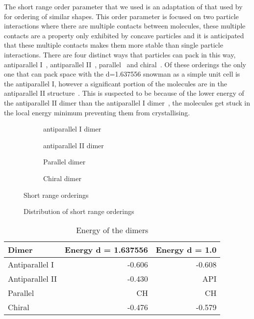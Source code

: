 The short range order parameter that we used is an adaptation of that used by~\textcite{} for ordering of similar shapes. This order parameter is focused on two particle interactions where there are multiple contacts between molecules, these multiple contacts are a property only exhibited by concave particles and it is anticipated that these multiple contacts makes them more stable than single particle interactions. There are four distinct ways that particles can pack in this way, antiparallel I~, antiparallel II~, parallel~ and chiral~. Of these orderings the only one that can pack space with the d=1.637556 snowman as a simple unit cell is the antiparallel I, however a significant portion of the molecules are in the antiparallel II structure~. This is suspected to be because of the lower energy of the antiparallel II dimer than the antiparallel I dimer~, the molecules get stuck in the local energy minimum preventing them from crystallising.

\begin{figure}
    \begin{subfigure}{0.5\textwidth}
        \caption{antiparallel I dimer}
        \label{fig:antiparallel i}
    \end{subfigure}
    \begin{subfigure}{0.5\textwidth}
        \caption{antiparallel II dimer}
        \label{fig:antiparallel ii}
    \end{subfigure}
    \begin{subfigure}{0.5\textwidth}
        \caption{Parallel dimer}
        \label{fig:parallel}
    \end{subfigure}
    \begin{subfigure}{0.5\textwidth}
        \caption{Chiral dimer}
        \label{fig:chiral}
    \end{subfigure}
    \caption{Short range orderings}
    \label{fig:short range order}
\end{figure}

\begin{figure}
    \caption{Distribution of short range orderings}
    \label{fig:short order hist}
\end{figure}

\begin{table}
    \centering
    \begin{tabular}{l r r}
        Dimer & Energy d = 1.637556 & Energy d = 1.0 \\ \hline
        Antiparallel I &  -0.606 & -0.608 \\
        Antiparallel II & -0.430 & API\\
        Parallel & CH & CH \\
        Chiral & -0.476 & -0.579 \\
    \end{tabular}
    \caption{Energy of the dimers}
    \label{tab:dimer energy}
\end{table}

